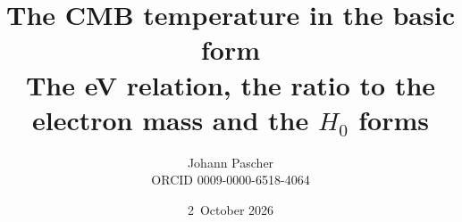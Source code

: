\documentclass[11pt,a4paper]{report}
\title{The CMB temperature in the basic form\\[0.5em]
  \large The eV relation, the ratio to the electron mass and the $H_0$ forms}
\date{2~October 2026}
\author{Johann Pascher\\\small ORCID 0009-0000-6518-4064}
\begin{document}
\renewcommand{\thechapter}{}
\renewcommand{\thesection}{\arabic{section}}
\maketitle
\tableofcontents

\end{document}
